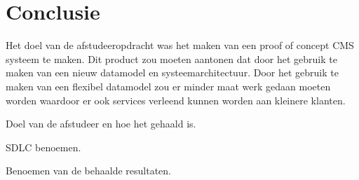 \chapter{Conclusie}
Het doel van de afstudeeropdracht was het maken van een proof of concept \gls{CMS} systeem te maken.
Dit product zou moeten aantonen dat door het gebruik te maken van een nieuw datamodel en systeemarchitectuur.
Door het gebruik te maken van een flexibel datamodel zou er minder maat werk gedaan  moeten worden waardoor er ook services verleend kunnen worden aan kleinere klanten.



\whitespace
Doel van de afstudeer en hoe het gehaald is.

\whitespace
SDLC benoemen.

\whitespace
Benoemen van de behaalde resultaten.


